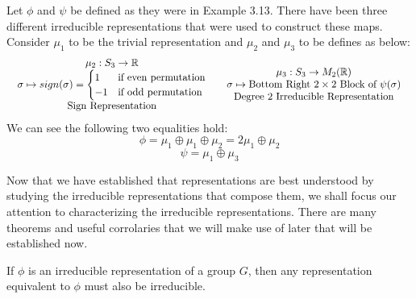 \begin{example}\end{example}
	Let $\phi$ and $\psi$ be defined as they were in Example 3.13. There have been three different irreducible representations that were used to construct these maps. Consider $\mu_1$ to be the trivial representation and $\mu_2$ and $\mu_3$ to be defines as below:
$$\begin{array}{c c}
	\begin{array}{c}
		\mu_2 : S_3 \rightarrow \mathbb{R} \\
		\sigma \mapsto sign(\sigma) = \begin{cases}
										1 & \text{if even permutation} \\
										-1 & \text{if odd permutation}
									   \end{cases}\\
		\text{Sign Representation}
	\end{array}
&
	\begin{array}{c}
		\mu_3 : S_3 \rightarrow M_2(\mathbb{R}) \\
		\sigma \mapsto \text{Bottom Right } 2\times2 \text{ Block of } \psi(\sigma)\\
		\text{Degree 2 Irreducible Representation}
	\end{array}
\end{array}$$
We can see the following two equalities hold:
$$\phi = \mu_1 \oplus \mu_1 \oplus \mu_2 = 2\mu_1 \oplus \mu_2$$
$$\psi = \mu_1 \oplus \mu_3$$

Now that we have established that representations are best understood by studying the irreducible representations that compose them, we shall focus our attention to characterizing the irreducible representations. There are many theorems and useful corrolaries that we will make use of later that will be established now.

\begin{theorem}
	If $\phi$ is an irreducible representation of a group $G$, then any representation equivalent to $\phi$ must also be irreducible.
\end{theorem}

